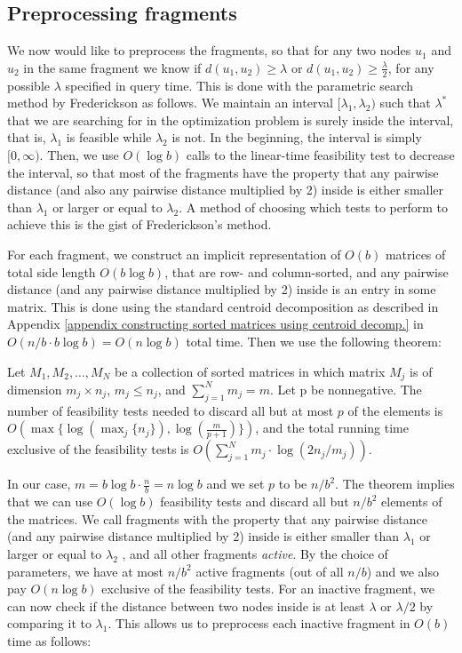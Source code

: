\documentclass[a4paper,UKenglish]{lipics-v2016}
\theoremstyle{plain}
\begin{document}
\subsection{Preprocessing fragments} \label{Pre-Processing Fragments}
We now would like to preprocess the fragments, so that for any two nodes $u_{1}$ and $u_{2}$ in the same fragment we know
if $d(u_1,u_2)\geq\lambda$ or $d(u_1,u_2) \geq \frac{\lambda}{2}$, for any possible $\lambda$ specified in query time. 
This is done with the parametric search method by Frederickson as follows. We maintain an interval $[\lambda_1,\lambda_2)$ such that
$\lambda^{*}$ that we are searching for in the optimization problem is surely inside the interval, that is, $\lambda_{1}$ is feasible
while $\lambda_{2}$ is not. In the beginning, the interval is simply $[0,\infty)$. Then, we use $O(\log b)$ calls to the
linear-time feasibility test to decrease the interval, so that most of the fragments have the property that any pairwise distance
(and also any pairwise distance multiplied by 2) inside is either smaller than $\lambda_{1}$ or larger or equal to $\lambda_{2}$.
A method of choosing which tests to perform to achieve this is the gist of Frederickson's method.

For each fragment, we construct an implicit representation of $O(b)$ matrices of total side length $O(b\log b)$, that are row- and column-sorted,
and any pairwise distance (and any pairwise distance multiplied by 2) inside is an entry in some matrix. This is done using the standard centroid 
decomposition as described in Appendix \ref{appendix constructing sorted matrices using centroid decomp.} in $O(n/b\cdot b\log b)=O(n\log b)$
total time. Then we use the following theorem:

\begin{theorem}\label{Frederickson's theorem}
Let  ${M_1, M_2, . . . , M_N}$ be a collection of sorted matrices in which matrix $M_j$ is of dimension $m_j \times n_j$, $m_j \leq n_j$, and $\sum_{j=1}^{N} m_j = m$.
Let p be nonnegative. The number of feasibility tests needed to discard all but at most $p$ of the elements is $O(\max \lbrace \log(\max_{j} \lbrace n_j \rbrace), \log(\frac{m}{p+1}) \rbrace)$, and the total running time exclusive of the feasibility tests is $O(\sum_{j=1}^{N} m_j \cdot \log (2n_j/m_j))$.
\end{theorem}
In our case, $m=b \log b \cdot \frac{n}{b} = n \log b$ and we set $p$ to be $n/b^2$. The theorem implies that we can use $O(\log b)$ feasibility tests and discard all but $n/b^2$ elements of the matrices.
We call fragments with the property that any pairwise distance (and any pairwise distance multiplied by 2) inside is either smaller than
$\lambda_{1}$ or larger or equal to $\lambda_{2}$ , and all other fragments \textit{active}.
By the choice of parameters, we have at most $n/b^{2}$ active fragments (out of all $n/b$) and we also pay $O(n \log b)$ exclusive of the feasibility tests.
For an inactive fragment, we can now check if the distance between two nodes inside is at least $\lambda$ or $\lambda/2$ by
comparing it to $\lambda_{1}$.
This allows us to preprocess each inactive fragment in $O(b)$ time as follows:
\end{document}
